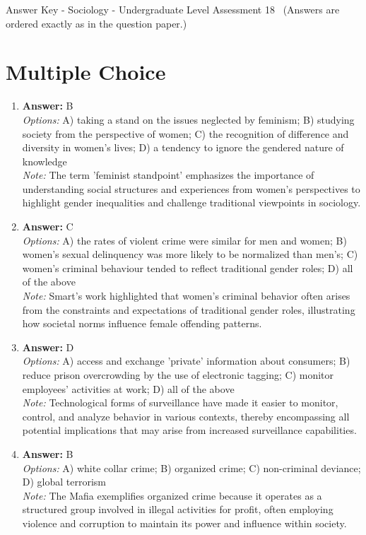 \documentclass[12pt]{article}
\begin{document}
\begin{center}
Answer Key - Sociology - Undergraduate Level Assessment 18 \
\small (Answers are ordered exactly as in the question paper.)
\end{center}

\section*{Multiple Choice}
\begin{enumerate}[label=\arabic*.]
\item \textbf{Answer:} B
\\ \textit{Options:} A) taking a stand on the issues neglected by feminism; B) studying society from the perspective of women; C) the recognition of difference and diversity in women's lives; D) a tendency to ignore the gendered nature of knowledge
\\ \textit{Note:} The term 'feminist standpoint' emphasizes the importance of understanding social structures and experiences from women's perspectives to highlight gender inequalities and challenge traditional viewpoints in sociology.
\item \textbf{Answer:} C
\\ \textit{Options:} A) the rates of violent crime were similar for men and women; B) women's sexual delinquency was more likely to be normalized than men's; C) women's criminal behaviour tended to reflect traditional gender roles; D) all of the above
\\ \textit{Note:} Smart's work highlighted that women's criminal behavior often arises from the constraints and expectations of traditional gender roles, illustrating how societal norms influence female offending patterns.
\item \textbf{Answer:} D
\\ \textit{Options:} A) access and exchange 'private' information about consumers; B) reduce prison overcrowding by the use of electronic tagging; C) monitor employees' activities at work; D) all of the above
\\ \textit{Note:} Technological forms of surveillance have made it easier to monitor, control, and analyze behavior in various contexts, thereby encompassing all potential implications that may arise from increased surveillance capabilities.
\item \textbf{Answer:} B
\\ \textit{Options:} A) white collar crime; B) organized crime; C) non-criminal deviance; D) global terrorism
\\ \textit{Note:} The Mafia exemplifies organized crime because it operates as a structured group involved in illegal activities for profit, often employing violence and corruption to maintain its power and influence within society.

\end{enumerate}
\end{document}
